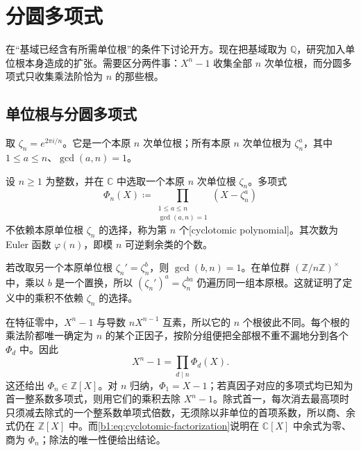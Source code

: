 
\section{分圆多项式}
\label{b1:sec:2101}

在“基域已经含有所需单位根”的条件下讨论开方。现在把基域取为 \(\mathbb Q\)，研究加入单位根本身造成的扩张。需要区分两件事：\(X^n-1\) 收集全部 \(n\) 次单位根，而分圆多项式只收集乘法阶恰为 \(n\) 的那些根。

%
%

\subsection{单位根与分圆多项式}
\label{b1:subsec:2101:01}

取 \(\zeta_n=e^{2\pi i/n}\)。它是一个本原 \(n\) 次单位根；所有本原 \(n\) 次单位根为 \(\zeta_n^a\)，其中 \(1\leq a\leq n\)、\(\gcd(a,n)=1\)。

\begin{definition}\label{b1:def:cyclotomic-polynomial}
	设 \(n\geq1\) 为整数，并在 \(\mathbb C\) 中选取一个本原 \(n\) 次单位根 \(\zeta_n\)。多项式
	\[
		\Phi_n(X)\coloneqq\prod_{\substack{1\leq a\leq n\\\gcd(a,n)=1}}(X-\zeta_n^a)
	\]
	不依赖本原单位根 \(\zeta_n\) 的选择，称为第 \(n\) 个[cyclotomic polynomial]。其次数为 Euler 函数 \(\varphi(n)\)，即模 \(n\) 可逆剩余类的个数。
\end{definition}

若改取另一个本原单位根 \(\zeta_n'=\zeta_n^b\)，则 \(\gcd(b,n)=1\)。在单位群 \((\mathbb Z/n\mathbb Z)^\times\) 中，乘以 \(b\) 是一个置换，所以 \((\zeta_n')^a=\zeta_n^{ba}\) 仍遍历同一组本原根。这就证明了定义中的乘积不依赖 \(\zeta_n\) 的选择。

\ProseParagraphBreak
在特征零中，\(X^n-1\) 与导数 \(nX^{n-1}\) 互素，所以它的 \(n\) 个根彼此不同。每个根的乘法阶都唯一确定为 \(n\) 的某个正因子，按阶分组便把全部根不重不漏地分到各个 \(\Phi_d\) 中。因此
\begin{equation}\label{b1:eq:cyclotomic-factorization}
	X^n-1=\prod_{d\mid n}\Phi_d(X).
\end{equation}
这还给出 \(\Phi_n\in\mathbb Z[X]\)。对 \(n\) 归纳，\(\Phi_1=X-1\)；若真因子对应的多项式均已知为首一整系数多项式，则用它们的乘积去除 \(X^n-1\)。除式首一，每次消去最高项时只须减去除式的一个整系数单项式倍数，无须除以非单位的首项系数，所以商、余式仍在 \(\mathbb Z[X]\) 中。而\eqref{b1:eq:cyclotomic-factorization}说明在 \(\mathbb C[X]\) 中余式为零、商为 \(\Phi_n\)；除法的唯一性便给出结论。

